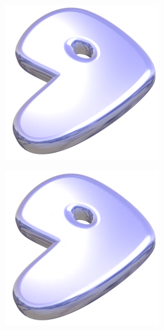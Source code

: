 \documentclass[11pt]{report}
\theoremstyle{plain}
\theoremstyle{remark}
\begin{document}
\begin{figure}
	\centering	
	\begin{subfigure}[b]{0.24\textwidth}
		\centering
		\includegraphics[width=\textwidth]{plaatjes/gentoo_db2_0_15.png}
	\end{subfigure}
	\begin{subfigure}[b]{0.24\textwidth}
		\centering
		\includegraphics[width=\textwidth]{plaatjes/gentoo_db2_0_1.png}

\end{subfigure}
\end{figure}
\end{document}
